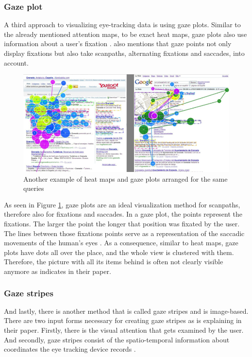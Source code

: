 \subsubsection{Gaze plot}
A third approach to visualizing eye-tracking data is using gaze plots. Similar to the already mentioned attention maps, to be exact heat maps, gaze plots also use information about a user's fixation \autocite[]{kurzhals2016gaze}. \textcite[]{kurzhals2016gaze} also mentions that gaze points not only display fixations but also take scanpaths, alternating fixations and saccades, into account. 

\begin{figure}[!ht]
    \centering
    \includegraphics[width=1\linewidth]{images/GazePlot_gonzalez2011different.png}
    \caption{
       Another example of heat maps and gaze plots arranged for the same queries \autocite[12]{gonzalez2011different}
    }
    \label{figure:GazePlot}
\end{figure}

As seen in Figure \ref{figure:GazePlot}, gaze plots are an ideal visualization method for scanpaths, therefore also for fixations and saccades. In a gaze plot, the points represent the fixations. The larger the point the longer that position was fixated by the user. The lines between those fixations points serve as a representation of the saccadic movements of the human's eyes \autocite[]{djamasbi2014eye}.
As a consequence, similar to heat maps, gaze plots have dots all over the place, and the whole view is clustered with them. Therefore, the picture with all its items behind is often not clearly visible anymore as \textcite[]{djamasbi2014eye} indicates in their paper.

\subsubsection{Gaze stripes}
And lastly, there is another method that is called gaze stripes and is image-based. There are two input forms necessary for creating gaze stripes as \textcite{kurzhals2016gaze} is explaining in their paper. Firstly, there is the visual attention that gets examined by the user. And secondly, gaze stripes consist of the spatio-temporal information about coordinates the eye tracking device records \autocite{kurzhals2016gaze}.

